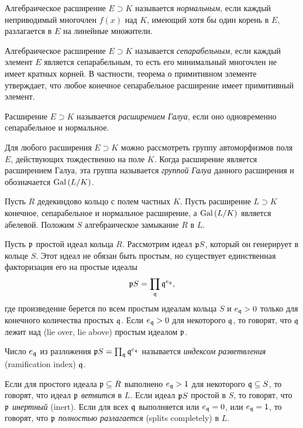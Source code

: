 \documentclass[_00_autoref.tex]{subfiles}
\begin{document}
\begin{definition}
    Алгебраическое расширение $E \supset K$ называется \emph{нормальным}, если каждый неприводимый многочлен $f(x)$ над $K$, имеющий хотя бы один корень в $E$, разлагается в $E$ на линейные множители.

    Алгебраическое расширение $E \supset K$ называется \emph{сепарабельным}, если каждый элемент $E$ является сепарабельным, то есть его минимальный многочлен не имеет кратных корней.
    В частности, теорема о примитивном элементе утверждает, что любое конечное сепарабельное расширение имеет примитивный элемент.
    
    Расширение $E \supset K$ называется \emph{расширением Галуа}, если оно одновременно сепарабельное и нормальное.

    Для любого расширения $E \supset K$ можно рассмотреть группу автоморфизмов поля $E$, действующих тождественно на поле $K$.
    Когда расширение является расширением Галуа, эта группа называется \emph{группой Галуа} данного расширения и обозначается $\textrm{Gal}\left(L/K\right)$.
\end{definition}

Пусть $R$ дедекиндово кольцо с полем частных $K$.
Пусть расширение $L \supset K$ конечное, сепарабельное и нормальное расширение, а $\textrm{Gal}\left(L/K\right)$ является абелевой.
Положим $S$ алгебраическое замыкание $R$ в $L$.

\begin{definition}
    Пусть $\mathfrak{p}$ простой идеал кольца $R$.
    Рассмотрим идеал $\mathfrak{p}S$, который он генерирует в кольце $S$.
    Этот идеал не обязан быть простым, но существует единственная факторизация его на простые идеалы
    \begin{equation*}
        \mathfrak{p}S = \prod_{\mathfrak{q}} \mathfrak{q}^{e_{\mathfrak{q}}},
    \end{equation*}
    где произведение берется по всем простым идеалам кольца $S$ и $e_{\mathfrak{q}} > 0$ только для конечного количества простых $\mathfrak{q}$.
    Если $e_{\mathfrak{q}} > 0$ для некоторого $\mathfrak{q}$, то говорят, что $\mathfrak{q}$ лежит над (lie over, lie above) простым идеалом $\mathfrak{p}$.

    Число $e_{\mathfrak{q}}$ из разложения $\mathfrak{p}S = \prod_{\mathfrak{q}} \mathfrak{q}^{e_{\mathfrak{q}}}$ называется \emph{индексом разветвления} (ramification index) $\mathfrak{q}$.

    Если для простого идеала $\mathfrak{p} \subseteq R$ выполнено $e_{\mathfrak{q}} > 1$ для некоторого $\mathfrak{q} \subseteq S$, то говорят, что идеал $\mathfrak{p}$ \emph{ветвится} в $L$.
    Если идеал $\mathfrak{p}S$ простой в $S$, то говорят, что $\mathfrak{p}$ \emph{инертный} (inert).
    Если для всех $\mathfrak{q}$ выполняется или $e_{\mathfrak{q}} = 0$, или $e_{\mathfrak{q}} = 1$, то говорят, что $\mathfrak{p}$ \emph{полностью разлагается} (splits completely) в $L$.
\end{definition}
\end{document}
